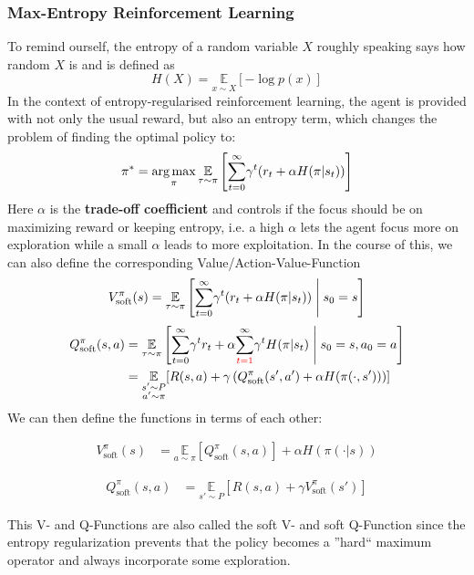 \subsubsection{Max-Entropy Reinforcement Learning}
To remind ourself, the entropy  of a random variable $X$ roughly speaking says how random $X$ is and is defined as 
$$ H(X) = \underset{x\sim X}{\mathbb{E}}[-\log{p(x)}]$$ 
In the context of entropy-regularised reinforcement learning, the agent is provided with not only the usual reward, 
but also an entropy term, which changes the problem of finding the optimal policy to:
$$ \pi^* = \operatorname*{arg\,max}\limits_\pi \underset{\tau\sim \pi}{\mathbb{E}}\left[\underset{t=0}{\sum^\infty}\gamma^t(r_t+\alpha H(\pi|s_t)) \right]$$ 
Here $\alpha$ is the \textbf{trade-off coefficient} and controls if the focus should be on maximizing reward or keeping entropy, i.e.
a high $\alpha$ lets the agent focus more on exploration while a small $\alpha$ leads to more exploitation. In the course of this, we can 
also define the corresponding Value/Action-Value-Function 
\begin{equation*}
      V_\text{soft}^\pi(s) =  \underset{\tau\sim \pi}{\mathbb{E}}\left[\underset{t=0}{\sum^\infty}
     \gamma^t(r_t+\alpha H(\pi|s_t))  \;\middle|\; s_0 = s \right] 
\end{equation*}
\begin{align*}
            Q_\text{soft}^\pi(s,a) &=  \underset{\tau\sim \pi}{\mathbb{E}}\left[\underset{t=0}
        {\sum^\infty}\gamma^t r_t + \alpha \underset{\color{red}t=1}{\sum^\infty} 
        \gamma^t H(\pi|s_t) \;\middle|\; s_0=s,a_0=a\right] \\
         &=\underset{\substack{s'\sim P \\ a' \sim \pi}}{\mathbb{E}}[R(s,a)+\gamma \left(Q_\text{soft}^\pi(s',a')+\alpha H(\pi(\cdot,s'))\right)]
\end{align*}
We can then define the functions in terms of each other: \newline
\noindent\begin{minipage}{0.5\linewidth}
    \begin{align}
     V_\text{soft}^\pi(s) &=  \underset{a\sim \pi}{\mathbb{E}}[Q_\text{soft}^{\pi}(s,a)] + \alpha H\left(\pi(\cdot|s)\right)  \label{soft_v_bellman}
    \end{align}
\end{minipage}%
\begin{minipage}{0.5\linewidth}
    \begin{align}
        Q_\text{soft}^\pi(s,a) &=  \underset{s'\sim P}{\mathbb{E}}[R(s,a)+\gamma V_\text{soft}^\pi(s')] \label{soft_q_bellman}
    \end{align}
\end{minipage}\newline\newline 
This V- and Q-Functions are also called the soft V- and soft Q-Function since the entropy regularization prevents
that the policy becomes a ''hard`` maximum operator and always incorporate some exploration.


